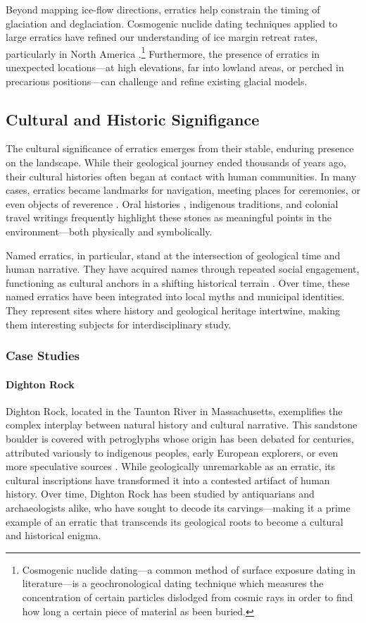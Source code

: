 \documentclass{article}
\begin{document}
Beyond mapping ice-flow directions, erratics help constrain the timing of glaciation and deglaciation. Cosmogenic nuclide dating techniques applied to large erratics have refined our understanding of ice margin retreat rates, particularly in North America \cite{Colgan2009, Clark2018}.\footnote{Cosmogenic nuclide dating---a common method of surface exposure dating in literature---is a geochronological dating technique which measures the concentration of certain particles dislodged from cosmic rays in order to find how long a certain piece of material as been buried.} Furthermore, the presence of erratics in unexpected locations---at high elevations, far into lowland areas, or perched in precarious positions---can challenge and refine existing glacial models.

\subsection{Cultural and Historic Signifigance}\label{sec:Cultural}
The cultural significance of erratics emerges from their stable, enduring presence on the landscape. While their geological journey ended thousands of years ago, their cultural histories often began at contact with human communities. In many cases, erratics became landmarks for navigation, meeting places for ceremonies, or even objects of reverence \cite{Hellerstein2007, Delabarre1928}. Oral histories \cite{Hoyt1971}, indigenous traditions, and colonial travel writings frequently highlight these stones as meaningful points in the environment---both physically and symbolically.

Named erratics, in particular, stand at the intersection of geological time and human narrative. They have acquired names through repeated social engagement, functioning as cultural anchors in a shifting historical terrain \cite{Hutton2013, Martin2019}. Over time, these named erratics have been integrated into local myths and municipal identities. They represent sites where history and geological heritage intertwine, making them interesting subjects for interdisciplinary study.
\subsubsection{Case Studies}
\paragraph{Dighton Rock}
Dighton Rock, located in the Taunton River in Massachusetts, exemplifies the complex interplay between natural history and cultural narrative. This sandstone boulder is covered with petroglyphs whose origin has been debated for centuries, attributed variously to indigenous peoples, early European explorers, or even more speculative sources \cite{Delabarre1928}. While geologically unremarkable as an erratic, its cultural inscriptions have transformed it into a contested artifact of human history. Over time, Dighton Rock has been studied by antiquarians and archaeologists alike, who have sought to decode its carvings---making it a prime example of an erratic that transcends its geological roots to become a cultural and historical enigma.
\end{document}
